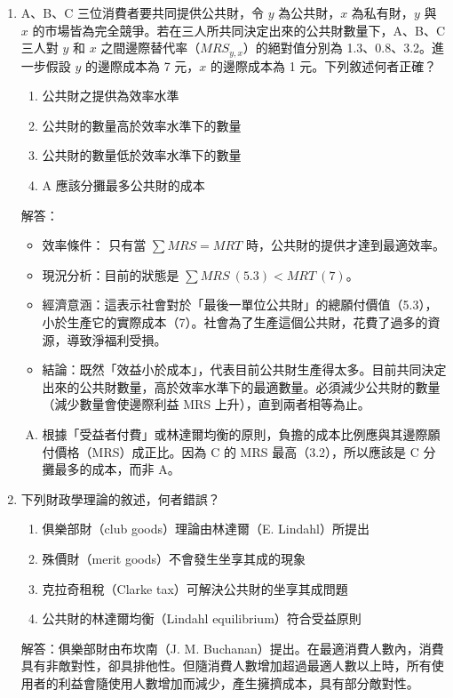 \documentclass[12pt, a4paper]{article}
\begin{document}
\begin{enumerate}
    \item A、B、C 三位消費者要共同提供公共財，令 \(y\) 為公共財，\(x\) 為私有財，\(y\) 與 \(x\) 的市場皆為完全競爭。若在三人所共同決定出來的公共財數量下，A、B、C 三人對 \(y\) 和 \(x\) 之間邊際替代率（\(MRS_{y,x}\)）的絕對值分別為 1.3、0.8、3.2。進一步假設 \(y\) 的邊際成本為 7 元，\(x\) 的邊際成本為 1 元。下列敘述何者正確？
    \begin{enumerate}[label=\Alph*.]
        \item 公共財之提供為效率水準
        \item 公共財的數量高於效率水準下的數量
        \item 公共財的數量低於效率水準下的數量
        \item A 應該分攤最多公共財的成本
    \end{enumerate}
    解答：
    \begin{itemize}
        \item 效率條件： 只有當 \(\sum MRS = MRT\) 時，公共財的提供才達到最適效率。
        \item 現況分析：目前的狀態是 \(\sum MRS\ (5.3) < MRT\ (7)\)。
        \item 經濟意涵：這表示社會對於「最後一單位公共財」的總願付價值（5.3），小於生產它的實際成本（7）。社會為了生產這個公共財，花費了過多的資源，導致淨福利受損。
        \item 結論：既然「效益小於成本」，代表目前公共財生產得太多。目前共同決定出來的公共財數量，高於效率水準下的最適數量。必須減少公共財的數量（減少數量會使邊際利益 MRS 上升），直到兩者相等為止。
    \end{itemize}
    \begin{enumerate}[D.]
        \item 根據「受益者付費」或林達爾均衡的原則，負擔的成本比例應與其邊際願付價格（MRS）成正比。因為 C 的 MRS 最高（3.2），所以應該是 C 分攤最多的成本，而非 A。
    \end{enumerate}

    \item 下列財政學理論的敘述，何者錯誤？
    \begin{enumerate}[label=\Alph*.]
        \item 俱樂部財（club goods）理論由林達爾（E. Lindahl）所提出
        \item 殊價財（merit goods）不會發生坐享其成的現象
        \item 克拉奇租稅（Clarke tax）可解決公共財的坐享其成問題
        \item 公共財的林達爾均衡（Lindahl equilibrium）符合受益原則
    \end{enumerate}
    解答：俱樂部財由布坎南（J. M. Buchanan）提出。在最適消費人數內，消費具有非敵對性，卻具排他性。但隨消費人數增加超過最適人數以上時，所有使用者的利益會隨使用人數增加而減少，產生擁擠成本，具有部分敵對性。


\end{enumerate}
\end{document}
